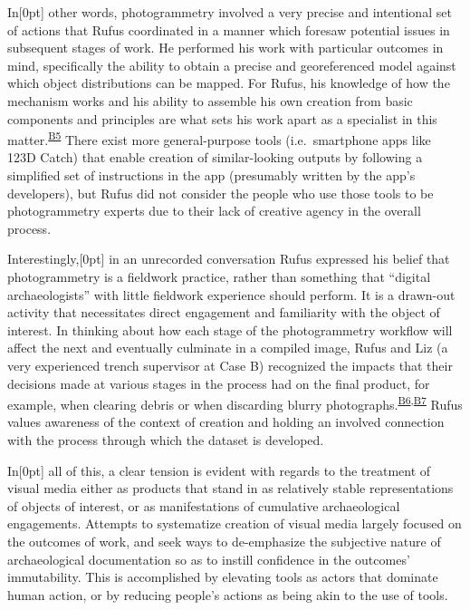 \documentclass[
]{article}
\newcommand{\paragraphnumber}[1]{\marginnote{\color{lightgray}\tiny{#1}}[0pt]}
\begin{document}
In\paragraphnumber{[66]} other words, photogrammetry involved a very
precise and intentional set of actions that Rufus coordinated in a
manner which foresaw potential issues in subsequent stages of work. He
performed his work with particular outcomes in mind, specifically the
ability to obtain a precise and georeferenced model against which object
distributions can be mapped. For Rufus, his knowledge of how the
mechanism works and his ability to assemble his own creation from basic
components and principles are what sets his work apart as a specialist
in this matter.\textsuperscript{\hyperref[sec-B5]{B5}} There exist more
general-purpose tools (i.e.~smartphone apps like 123D Catch) that enable
creation of similar-looking outputs by following a simplified set of
instructions in the app (presumably written by the app's developers),
but Rufus did not consider the people who use those tools to be
photogrammetry experts due to their lack of creative agency in the
overall process.

Interestingly,\paragraphnumber{[67]} in an unrecorded conversation Rufus
expressed his belief that photogrammetry is a fieldwork practice, rather
than something that ``digital archaeologists'' with little fieldwork
experience should perform. It is a drawn-out activity that necessitates
direct engagement and familiarity with the object of interest. In
thinking about how each stage of the photogrammetry workflow will affect
the next and eventually culminate in a compiled image, Rufus and Liz (a
very experienced trench supervisor at Case B) recognized the impacts
that their decisions made at various stages in the process had on the
final product, for example, when clearing debris or when discarding
blurry
photographs.\textsuperscript{\hyperref[sec-B6]{B6},\hyperref[sec-B7]{B7}}
Rufus values awareness of the context of creation and holding an
involved connection with the process through which the dataset is
developed.

In\paragraphnumber{[68]} all of this, a clear tension is evident with
regards to the treatment of visual media either as products that stand
in as relatively stable representations of objects of interest, or as
manifestations of cumulative archaeological engagements. Attempts to
systematize creation of visual media largely focused on the outcomes of
work, and seek ways to de-emphasize the subjective nature of
archaeological documentation so as to instill confidence in the
outcomes' immutability. This is accomplished by elevating tools as
actors that dominate human action, or by reducing people's actions as
being akin to the use of tools.
\end{document}
